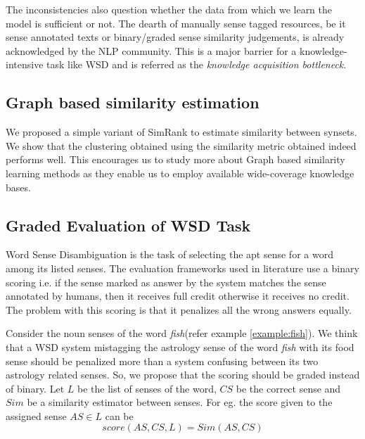 The inconsistencies also question whether the data from which we learn the model is sufficient or not. The dearth of manually sense tagged resources, be it sense annotated texts or binary/graded sense similarity judgements, is already acknowledged by the NLP community. This is a major barrier for a knowledge-intensive task like WSD and is referred as  the \textit{knowledge acquisition bottleneck}. 

\begin{comment}
\subsection{Modifying Feature Space - Correlated Features}
Many features used in learning the Support Vector Machine are possibly correlated for eg. the $L1$ distance, $L2$  distance and the cosine similarity between the domain belongingness vectors of the two synsets. We can use techniques like Principal Component Analysis to convert a set of observations of possibly correlated variables into a set of values of linearly uncorrelated variables. One can also try to use systems like Deep Belief Networks \citep{hinton2006DBN} to get combinations of features which can be more differentiating than the original set of features.
\end{comment}

\subsection{Graph based similarity estimation}
We proposed a simple variant of SimRank \citep{Jeh02simrank} to estimate similarity between synsets. We show that the clustering obtained using the similarity metric obtained indeed performs well. This encourages us to study more about Graph based similarity learning methods as they enable us to employ available wide-coverage knowledge bases.

\subsection{Graded Evaluation of WSD Task}
Word Sense Disambiguation is the task of selecting the apt sense for a word among its listed senses. The evaluation frameworks used in literature use a binary scoring i.e. if the sense marked as answer by the system matches the sense annotated by humans, then it receives full credit otherwise it receives no credit. The problem with this scoring is that it penalizes all the wrong answers equally. 

Consider the noun senses of the word \textit{fish}(refer example \ref{example:fish}). We think that a WSD system mistagging the astrology sense of the word \textit{fish} with its food sense should be penalized more than a system confusing between its two astrology related senses. So, we propose that the scoring should be graded instead of binary. Let $L$ be the list of senses of the word, $CS$ be the correct sense and $Sim$ be a similarity estimator between senses. For eg. the score given to the assigned sense $AS \in L$ can be
\begin{equation}
\label{eq:proposedFramework}
score(AS,CS,L) = {Sim(AS,CS)}
\end{equation}